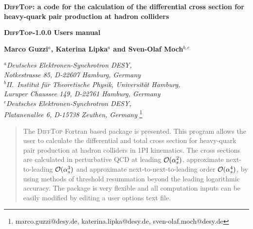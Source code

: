 \documentclass[11pt]{article}
\begin{document}
\hfill
\begin{center}

\vspace{1.0cm}
{\bf \large \textsc{DiffTop}: a code for the calculation of the differential cross section for heavy-quark pair production at hadron colliders}

\vspace{1.0cm}

{\bf \large \textsc{DiffTop}-1.0.0 Users manual}
\vspace{0.5cm}

\vspace{1cm}
{ \bf Marco Guzzi$^a$, Katerina Lipka$^a$ and Sven-Olaf Moch$^{b,c}$}




{\it $^a$Deutsches Elektronen-Synchrotron DESY, \\Notkestrasse 85, D-22607 Hamburg, Germany\\}
{\it $^b$II.~Institut f\"ur Theoretische Physik, Universit\"at Hamburg, \\Luruper Chaussee 149, D-22761 Hamburg, Germany\\}
{\it $^c$Deutsches Elektronen-Synchrotron DESY,\\ Platanenallee 6, D-15738 Zeuthen, Germany}
\vspace{.5cm}\footnote{marco.guzzi@desy.de, katerina.lipka@desy.de, sven-olaf.moch@desy.de}

\begin{abstract}


The \textsc{DiffTop} Fortran based package is presented. 
This program allows the user to calculate the differential and total cross section 
for heavy-quark pair production at hadron colliders in 1PI kinematics. 
The cross sections are calculated in perturbative 
QCD at leading ${\cal O}(\alpha_s^2)$, approximate next-to-leading ${\cal O}(\alpha_s^3)$ and 
approximate next-to-next-to-leading order ${\cal O}(\alpha_s^4)$, by using 
methods of threshold resummation beyond the leading logarithmic accuracy.
The package is very flexible and all computation inputs can be easily modified by 
editing a user options text file.


\end{abstract}
\end{center}
\date{\today}
\newpage
\end{document}
